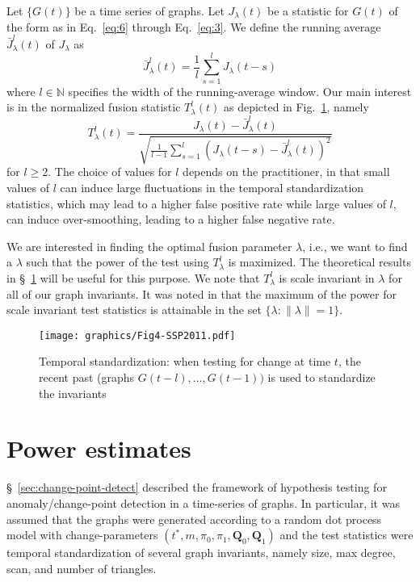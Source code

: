 \documentclass[10pt,draftclsnofoot,onecolumn]{IEEEtran}
\theoremstyle{definition}
\begin{document}
  Let $\{G(t)\}$ be a time series of graphs. Let $J_{\lambda}(t)$ be a
  statistic for $G(t)$ of the form as in Eq.~\eqref{eq:6} through
  Eq.~\eqref{eq:3}. We define the running average 
  $\bar{J}^{l}_\lambda(t)$ of $J_{\lambda}$ as
\begin{equation}
  \label{eq:4}
 \bar{J}^{l}_{\lambda}(t) = \frac{1}{l}\sum_{s = 1}^{l} J_{\lambda}(t - s) 
\end{equation}
where $l \in \mathbb{N}$ specifies the width of the running-average
window. Our main interest is in the normalized fusion statistic
$T_{\lambda}^{l}(t)$ as depicted in Fig.~\ref{fig:temporal}, namely
\begin{equation}
  \label{eq:7}
 T_{\lambda}^{l}(t) = %
   \frac{J_{\lambda}(t) -
     \bar{J}_{\lambda}^{l}(t)}{\sqrt{\tfrac{1}{l-1}
       \sum_{s=1}^{l}(J_{\lambda}(t - s) - \bar{J}_{\lambda}^{l}(t))^2}}
\end{equation}
for $l \geq 2$. The choice of values for $l$ depends on the
practitioner, in that small values of $l$ can
induce large fluctuations in the temporal standardization statistics,
which may lead to a higher false positive rate while large values of $l$,
can induce over-smoothing, leading to a higher
false negative rate. 

We are interested in finding the optimal fusion parameter $\lambda$,
i.e., we want to find a $\lambda$ such that
the power of the test using $T_{\lambda}^{l}$ is maximized. The
theoretical results in \S~\ref{sec:power-estimates} will be useful for
this purpose. We note that
$T_{\lambda}^{l}$ is scale invariant in $\lambda$ for all of our graph
invariants. It was noted in \cite{lee11} that the maximum of the power
for scale invariant test statistics is attainable in the set $\{ \lambda \colon \|
\lambda \| = 1 \}$. 
\begin{figure}[htbp]
  \centering
  \texttt{[image: graphics/Fig4-SSP2011.pdf]}
  \caption{Temporal standardization: when testing for change at time
    $t$, the recent past (graphs $G(t - l), \dots, G(t-1))$ is used to
    standardize the invariants}
  \label{fig:temporal}
\end{figure}
\section{Power estimates}
\label{sec:power-estimates}
\S~\ref{sec:change-point-detect} described the framework of hypothesis
testing for anomaly/change-point detection in a time-series of
graphs. In particular, it was assumed that the graphs were generated
according to a random dot process model with change-parameters
$(t^{*}, m, \pi_0, \pi_1, \mathbf{Q}_0, \mathbf{Q}_1)$ and the test 
statistics were temporal standardization of several graph invariants, 
namely size, max degree, scan, and number of triangles. 
\end{document}
